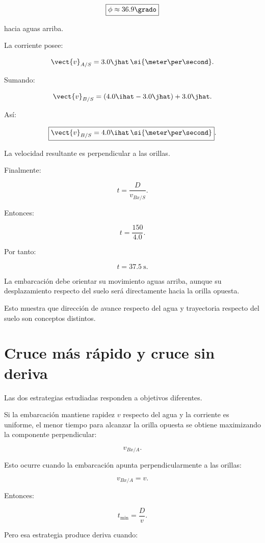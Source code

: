 \[
\boxed{
\phi\approx36.9\grado
}
\]

hacia aguas arriba.

La corriente posee:

\[
\vect{v}_{A/S}
=
3.0\jhat\,
\si{\meter\per\second}.
\]

Sumando:

\[
\vect{v}_{B/S}
=
(4.0\ihat-3.0\jhat)
+
3.0\jhat.
\]

Así:

\[
\boxed{
\vect{v}_{B/S}
=
4.0\ihat\,
\si{\meter\per\second}
}.
\]

La velocidad resultante es perpendicular
a las orillas.

Finalmente:

\[
t=\frac{D}{v_{Bx/S}}.
\]

Entonces:

\[
t=\frac{150}{4.0}.
\]

Por tanto:

\[
\boxed{
t=\SI{37.5}{\second}
}.
\]

\begin{interpretacion}

La embarcación debe orientar su movimiento
aguas arriba, aunque su desplazamiento respecto
del suelo será directamente hacia la orilla opuesta.

Esto muestra que dirección de avance respecto
del agua y trayectoria respecto del suelo
son conceptos distintos.

\end{interpretacion}


\section{Cruce más rápido y cruce sin deriva}

Las dos estrategias estudiadas responden
a objetivos diferentes.

Si la embarcación mantiene rapidez \(v\)
respecto del agua y la corriente es uniforme,
el menor tiempo para alcanzar la orilla opuesta
se obtiene maximizando la componente perpendicular:

\[
v_{Bx/A}.
\]

Esto ocurre cuando la embarcación apunta
perpendicularmente a las orillas:

\[
v_{Bx/A}=v.
\]

Entonces:

\[
\boxed{
t_{\min}=\frac{D}{v}
}.
\]

Pero esa estrategia produce deriva
cuando:

